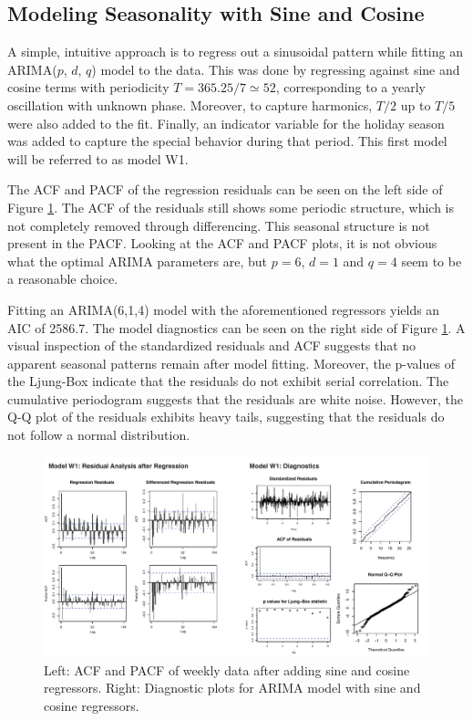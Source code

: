 \documentclass[conference]{IEEEtran}
\begin{document}
\subsection{Modeling Seasonality with Sine and Cosine}
A simple, intuitive approach is to regress out a sinusoidal pattern while fitting an ARIMA($p$, $d$, $q$) model to the data. This was done by regressing against sine and cosine terms with periodicity $T=365.25 / 7 \simeq 52$, corresponding to a yearly oscillation with unknown phase. Moreover, to capture harmonics, $T / 2$ up to $T / 5$ were also added to the fit. Finally, an indicator variable for the holiday season was added to capture the special behavior during that period. This first model will be referred to as model W1.
\par
The ACF and PACF of the regression residuals can be seen on the left side of Figure \ref{weekly_mod1}. The ACF of the residuals still shows some periodic structure, which is not completely removed through differencing. This seasonal structure is not present in the PACF. Looking at the ACF and PACF plots, it is not obvious what the optimal ARIMA parameters are, but $p=6$, $d=1$ and $q=4$ seem to be a reasonable choice. 
\par
Fitting an ARIMA(6,1,4) model with the aforementioned regressors yields an AIC of 2586.7. The model diagnostics can be seen on the right side of Figure \ref{weekly_mod1}. A visual inspection of the standardized residuals and ACF suggests that no apparent seasonal patterns remain after model fitting. Moreover, the p-values of the Ljung-Box indicate that the residuals do not exhibit serial correlation. The cumulative periodogram suggests that the residuals are white noise. However, the Q-Q plot of the residuals exhibits heavy tails, suggesting that the residuals do not follow a normal distribution.

\begin{figure}[ht]
	\centering
	\includegraphics[width=1\textwidth]{Figs/Fig3.pdf}
	\caption{Left: ACF and PACF of weekly data after adding sine and cosine regressors. Right: Diagnostic plots for ARIMA model with sine and cosine regressors.}
	\label{weekly_mod1}
\end{figure}
\end{document}

